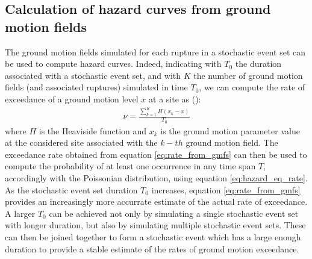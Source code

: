 \subsection{Calculation of hazard curves from ground motion fields}
The ground motion fields simulated for each rupture in a stochastic event set can be used to
compute hazard curves. Indeed, indicating with $T_{0}$ the duration associated with a stochastic
event set, and with $K$ the number of ground motion fields (and associated ruptures) simulated
in time $T_{0}$, we can compute the rate of exceedance of a ground motion level $x$ at a site as (\cite{ebel1999}):
\begin{align}
\label{eq:rate_from_gmfs}
\nu = \frac{\sum_{k=1}^{K}H(x_{k} - x)}{T_{0}}
\end{align}
where $H$ is the Heaviside function and $x_{k}$ is the ground motion parameter value at the considered site associated
with the $k-th$ ground motion field. The exceedance rate obtained from equation \ref{eq:rate_from_gmfs} can then be
used to compute the probability of at least one occurrence in any time span $T$, accordingly with the Poissonian distribution,
using equation \ref{eq:hazard_eq_rate}.\\
As the stochastic event set duration $T_{0}$ increases, equation \ref{eq:rate_from_gmfs}
provides an increasingly more accurrate estimate of the actual rate of exceedance. A larger $T_{0}$ can be achieved
not only by simulating a single stochastic event set with longer duration, but also by simulating multiple
stochastic event sets. These can then be joined together to form a stochastic event which has a large enough
duration to provide a stable estimate of the rates of ground motion exceedance.

